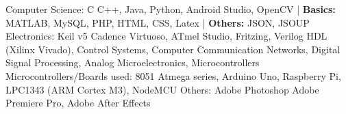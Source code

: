 \begin{cvhonors}
  \cvhonor
    {Computer Science: \textmd{C}}
    {C++, Java, Python, Android Studio, OpenCV | \textbf{Basics:} MATLAB, MySQL, PHP, HTML, CSS, Latex | \textbf{Others:}  JSON, JSOUP}
    {}
    {}
  \cvhonor
    {Electronics:  \textmd{Keil v5}}
    {Cadence Virtuoso, ATmel Studio, Fritzing, Verilog HDL (Xilinx Vivado), Control Systems, Computer Communication Networks, Digital Signal Processing, Analog Microelectronics, Microcontrollers}
    {}
     {}
     \cvhonor
    {Microcontrollers/Boards used:  \textmd{8051}}
    {Atmega series, Arduino Uno, Raspberry Pi, LPC1343 (ARM Cortex M3), NodeMCU}
    {}
     {}
     \cvhonor
    {Others: \textmd{Adobe Photoshop}}
    {Adobe Premiere Pro, Adobe After Effects}
    {}
    {}
\end{cvhonors}
